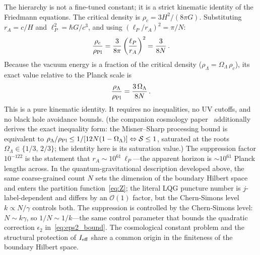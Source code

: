 \documentclass[aps,prd,twocolumn,10pt,superscriptaddress,nofootinbib]{revtex4-2}
\begin{document}
The hierarchy is not a fine-tuned constant; it is a strict
kinematic identity of the Friedmann equations.  The critical
density is $\rho_c = 3H^2/(8\pi G)$.  Substituting
$r_A = c/H$ and $\ell_P^2 = \hbar G/c^3$, and using
$(\ell_P/r_A)^2 = \pi/N$:
\begin{equation}
\frac{\rho_c}{\rho_{\rm Pl}}
  = \frac{3}{8\pi}\left(\frac{\ell_P}{r_A}\right)^2
  = \frac{3}{8N}\,.
\label{eq:rho_c_N}
\end{equation}
Because the vacuum energy is a fraction of the critical density
($\rho_\Lambda = \Omega_\Lambda\,\rho_c$), its exact value
relative to the Planck scale is
\begin{equation}
\frac{\rho_\Lambda}{\rho_{\rm Pl}}
  = \frac{3\,\Omega_\Lambda}{8N}\,.
\label{eq:pure_kinematic_hierarchy}
\end{equation}
This is a pure kinematic identity.  It requires no inequalities,
no UV cutoffs, and no black hole avoidance bounds.  (the companion cosmology paper~\cite{Sayegh2026}
additionally derives the exact inequality form: the Misner--Sharp
processing bound is equivalent to
$\rho_\Lambda/\rho_{\rm Pl} \le 1/[12N(1-\Omega_\Lambda)]
\Leftrightarrow \mathcal{S} \le 1$, saturated at the roots
$\Omega_\Lambda \in \{1/3,\,2/3\}$; the identity here is its
saturation value.)  The
suppression factor $10^{-122}$ is the statement that
$r_A \sim 10^{61}\,\ell_P$---the apparent horizon is
$\sim 10^{61}$ Planck lengths across.  In the quantum-gravitational description
developed above, the same coarse-grained count $N$ sets the
dimension of the boundary Hilbert space and enters the
partition function~\eqref{eq:Z}; the literal LQG puncture number
is $j$-label-dependent and differs by an $\mathcal{O}(1)$ factor,
but the Chern-Simons level $k \propto N/\gamma$ controls both.  The suppression is
controlled by the Chern-Simons level: $N \sim k\gamma$, so
$1/N \sim 1/k$---the same control parameter that bounds the
quadratic correction $\epsilon_2$
in~\eqref{eq:eps2_bound}.  The cosmological constant problem and
the structural protection of $I_{\rm eff}$ share a common origin
in the finiteness of the boundary Hilbert space.
\end{document}
